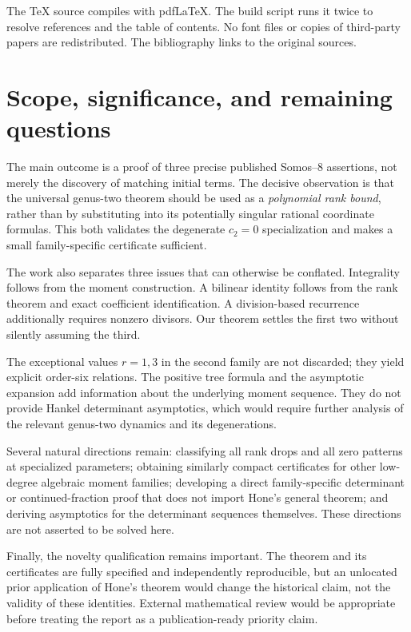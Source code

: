 \documentclass[11pt,letterpaper]{article}
\numberwithin{equation}{section}
\theoremstyle{definition}
\begin{document}
The TeX source compiles with pdfLaTeX. The build script runs it twice to
resolve references and the table of contents. No font files or copies of
third-party papers are redistributed. The bibliography links to the
original sources.

\section{Scope, significance, and remaining questions}
\label{sec:conclusion}

The main outcome is a proof of three precise published Somos--8 assertions,
not merely the discovery of matching initial terms. The decisive observation
is that the universal genus-two theorem should be used as a \emph{polynomial
rank bound}, rather than by substituting into its potentially singular
rational coordinate formulas. This both validates the degenerate
\(c_2=0\) specialization and makes a small family-specific certificate
sufficient.

The work also separates three issues that can otherwise be conflated.
Integrality follows from the moment construction. A bilinear identity follows
from the rank theorem and exact coefficient identification. A division-based
recurrence additionally requires nonzero divisors. Our theorem settles the
first two without silently assuming the third.

The exceptional values \(r=1,3\) in the second family are not discarded;
they yield explicit order-six relations. The positive tree formula and the
asymptotic expansion add information about the underlying moment sequence.
They do not provide Hankel determinant asymptotics, which would require
further analysis of the relevant genus-two dynamics and its degenerations.

Several natural directions remain: classifying all rank drops and all zero
patterns at specialized parameters; obtaining similarly compact certificates
for other low-degree algebraic moment families; developing a direct
family-specific determinant or continued-fraction proof that does not import
Hone's general theorem; and deriving asymptotics for the determinant sequences
themselves. These directions are not asserted to be solved here.

Finally, the novelty qualification remains important. The theorem and its
certificates are fully specified and independently reproducible, but an
unlocated prior application of Hone's theorem would change the historical
claim, not the validity of these identities. External mathematical review
would be appropriate before treating the report as a publication-ready
priority claim.
\end{document}
